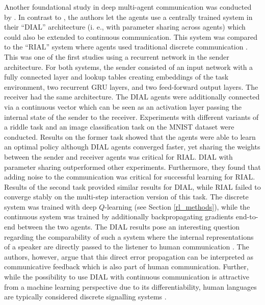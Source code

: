 Another foundational study in deep multi-agent communication was conducted by \cite{foerster2016learning}. In contrast to \cite{lazaridou2016multi}, the authors let the agents use a centrally trained system in their ``DIAL'' architecture (i. e., with parameter sharing across agents)  which could also be extended to continuous communication. This system was compared to the ``RIAL'' system where agents used traditional discrete communication \parencite[][p. 2]{foerster2016learning}. This was one of the first studies using a recurrent network in the sender architecture.
For both systems, the sender consisted of an input network with a fully connected layer and lookup tables creating embeddings of the task environment, two recurrent GRU layers, and two feed-forward output layers.
The receiver had the same architecture. The DIAL agents were additionally connected via a continuous vector which can be seen as an activation layer passing the internal state of the sender to the receiver.
Experiments with different variants of a riddle task and an image classification task on the MNIST dataset were conducted. Results on the former task showed that the agents were able to learn an optimal policy although DIAL agents converged faster, yet sharing the weights between the sender and receiver agents was critical for RIAL. DIAL with parameter sharing outperformed other experiments. Furthermore, they found that adding noise to the communication was critical for successful learning for RIAL. Results of the second task provided similar results for DIAL, while RIAL failed to converge stably on the multi-step interaction version of this task. 
The discrete system was trained with deep $Q$-learning (see Section \ref{rl_methods}), while the continuous system was trained by additionally backpropagating gradients end-to-end between the two agents. %
The DIAL results pose an interesting question regarding the comparability of such a system where the internal representations of a speaker are directly passed to the listener to human communication \parencite[cf.][]{lazaridou2020emergent, hockett1960origin}. The authors, however, argue that this direct error propagation can be interpreted as communicative feedback which is also part of human communication. Further, while the possibility to use DIAL with continuous communication is attractive from a machine learning perspective due to its differentiability, human languages are typically considered discrete signalling systems \parencite{hockett1960origin}. 

